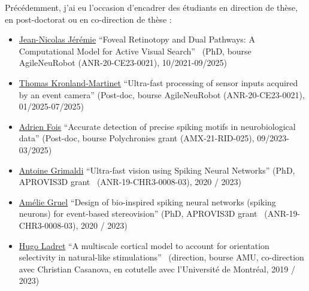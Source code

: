 \documentclass[10pt,french,a4paper]{article}%
\begin{document}
Précédemment, j'ai eu l'occasion d'encadrer des étudiants en direction de thèse, en post-doctorat ou en co-direction de thèse :
\begin{itemize}
	\item \href{https://laurentperrinet.github.io/author/jean-nicolas-jeremie/}{Jean-Nicolas Jérémie} ``Foveal Retinotopy and Dual Pathways: A Computational Model for Active Visual Search''~\textcite{Jeremie25thesis} (PhD, bourse AgileNeuRobot (ANR-20-CE23-0021), 10/2021-09/2025)
	\item \href{https://laurentperrinet.github.io/author/thomas-kronland-martinet/}{Thomas Kronland-Martinet} ``Ultra-fast processing of sensor inputs acquired by an event camera'' (Post-doc, bourse AgileNeuRobot (ANR-20-CE23-0021), 01/2025-07/2025)
	\item \href{https://laurentperrinet.github.io/author/adrien-fois/}{Adrien Fois} ``Accurate detection of precise spiking motifs in neurobiological data'' (Post-doc, bourse Polychronies grant (AMX-21-RID-025), 09/2023-03/2025)
	\item \href{https://laurentperrinet.github.io/author/antoine-grimaldi/}{Antoine Grimaldi} ``Ultra-fast vision using Spiking Neural Networks'' (PhD, APROVIS3D grant~\textcite{Grimaldi24thesis} (ANR-19-CHR3-0008-03), 2020 / 2023)
	\item \href{https://laurentperrinet.github.io/author/amélie-gruel/}{Amélie Gruel} ``Design of bio-inspired spiking neural networks (spiking neurons) for event-based stereovision'' (PhD, APROVIS3D grant~\textcite{Gruel23thesis} (ANR-19-CHR3-0008-03), 2020 / 2023)
	\item \href{https://laurentperrinet.github.io/author/hugo-ladret/}{Hugo Ladret} ``A multiscale cortical model to account for orientation selectivity in natural-like stimulations''~\textcite{Ladret24thesis}  (direction, bourse AMU, co-direction avec Christian Casanova, en cotutelle avec l'Université de Montréal, 2019 / 2023)

\end{itemize}
\end{document}
